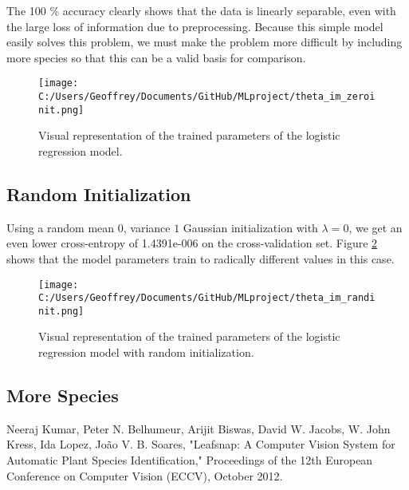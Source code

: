 \documentclass[12pt]{article}
\begin{document}
The 100 \% accuracy clearly shows that the data is linearly separable, even with the large loss of information due to preprocessing. Because this simple model easily solves this problem, we must make the problem more difficult by including more species so that this can be a valid basis for comparison.

\begin{figure}
\begin{center} 
 \texttt{[image: C:/Users/Geoffrey/Documents/GitHub/MLproject/theta\_im\_zeroinit.png]}
\end{center}
\caption{\label{fig:thetaZeroinitLogR} Visual representation of the trained parameters of the logistic regression model.}
\end{figure}

\subsection{Random Initialization} Using a random mean $0$, variance $1$ Gaussian initialization with $\lambda = 0$, we get an even lower cross-entropy of 1.4391e-006 on the cross-validation set. Figure \ref{fig:thetaRandinitLogR} shows that the model parameters train to radically different values in this case.

\begin{figure}
\begin{center}
 \texttt{[image: C:/Users/Geoffrey/Documents/GitHub/MLproject/theta\_im\_randinit.png]}
\end{center} 
\caption{\label{fig:thetaRandinitLogR} Visual representation of the trained parameters of the logistic regression model with random initialization.}
\end{figure}

\subsection{More Species}


\begin{thebibliography}{99}
 Neeraj Kumar, Peter N. Belhumeur, Arijit Biswas, David W. Jacobs, W. John Kress, Ida Lopez, Jo\~{a}o V. B. Soares, "Leafsnap: A Computer Vision System for Automatic Plant Species Identification," Proceedings of the 12th European Conference on Computer Vision (ECCV), October 2012.
\end{thebibliography}
\end{document}
